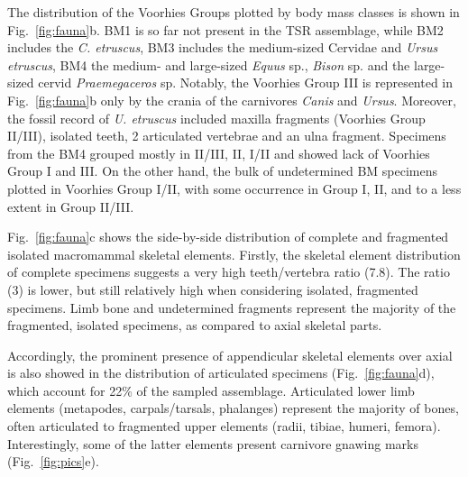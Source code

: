 \documentclass[review,times,authoryear]{elsarticle} %
\begin{document}
The distribution of the Voorhies Groups plotted by body mass classes is shown in Fig.~\ref{fig:fauna}b. BM1 is so far not present in the TSR assemblage, while BM2 includes the \emph{C. etruscus}, BM3 includes the medium-sized Cervidae and \emph{Ursus etruscus}, BM4 the medium- and large-sized \emph{Equus} sp., \emph{Bison} sp. and the large-sized cervid \emph{Praemegaceros} sp. Notably, the Voorhies Group III is represented in Fig.~\ref{fig:fauna}b only by the crania of the carnivores \emph{Canis} and \emph{Ursus}. Moreover, the fossil record of \emph{U. etruscus} included maxilla fragments (Voorhies Group II/III), isolated teeth, 2 articulated vertebrae and an ulna fragment. Specimens from the BM4 grouped mostly in II/III, II, I/II and showed lack of Voorhies Group I and III. On the other hand, the bulk of undetermined BM specimens plotted in Voorhies Group I/II, with some occurrence in Group I, II, and to a less extent in Group II/III.

Fig.~\ref{fig:fauna}c shows the side-by-side distribution of complete and fragmented isolated macromammal skeletal elements. Firstly, the skeletal element distribution of complete specimens suggests a very high teeth/vertebra ratio (7.8). The ratio (3) is lower, but still relatively high when considering isolated, fragmented specimens. Limb bone and undetermined fragments represent the majority of the fragmented, isolated specimens, as compared to axial skeletal parts.

Accordingly, the prominent presence of appendicular skeletal elements over axial is also showed in the distribution of articulated specimens (Fig.~\ref{fig:fauna}d), which account for 22\% of the sampled assemblage. Articulated lower limb elements (metapodes, carpals/tarsals, phalanges) represent the majority of bones, often articulated to fragmented upper elements (radii, tibiae, humeri, femora). Interestingly, some of the latter elements present carnivore gnawing marks (Fig.~\ref{fig:pics}e).
\end{document}
